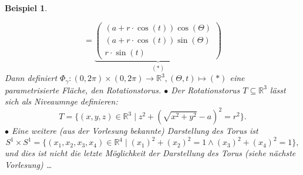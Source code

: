 \documentclass[a4paper,11pt,notitlepage]{report}
\newtheorem{example}{Beispiel}[chapter]
\newcommand{\R}{{\ensuremath{\mathbb{R}}}}
\begin{document}
\begin{example}
\begin{enumerate}
	$$= \underbrace{\begin{pmatrix}
	(a + r \cdot \cos{(t)})  \cos{(\Theta)} \\ (a + r \cdot \cos{(t)})  \sin{(\Theta)} \\ r \cdot \sin{(t)}
	\end{pmatrix} }_{(*)}$$
	Dann definiert $\Phi_\gamma \colon (0, 2\pi) \times (0, 2 \pi) \rightarrow \R^3, (\Theta, t) \mapsto (*)$
	eine parametrisierte Fläche, den Rotationstorus.
	\newline
	$\bullet$ Der Rotationstorus $T \subseteq \R^3$ lässt sich als Niveaumnge definieren: 
	$$T = \{(x,y,z) \in \R^3 \mid z^2 + (\sqrt{x^2+y^2}-a)^2 = r^2\}.$$
	$\bullet$ Eine weitere (aus der Vorlesung bekannte) Darstellung des Torus ist
	$$S^1 \times S^1 = \{(x_1,x_2,x_3,x_4) \in \R^4 \mid (x_1)^2 + (x_2)^2 = 1 \wedge (x_3)^2 + (x_4)^2 = 1 \},$$
	und dies ist nicht die letzte Möglichkeit der Darstellung des Torus (siehe nächste Vorlesung) \ldots 
	\end{enumerate}
\end{example}
\end{document}

